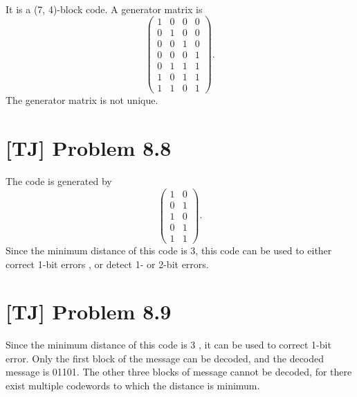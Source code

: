 \documentclass[a4paper,11pt,twocolumn]{article}
\begin{document}
\begin{enumerate}[(a)]
\begin{multline*}
    \end{multline*}
    It is a (7, 4)-block code. A generator matrix is
    $$ \begin{pmatrix}
      1 & 0 & 0 & 0 \\
      0 & 1 & 0 & 0 \\
      0 & 0 & 1 & 0 \\
      0 & 0 & 0 & 1 \\
      0 & 1 & 1 & 1 \\
      1 & 0 & 1 & 1 \\
      1 & 1 & 0 & 1
    \end{pmatrix}. $$
    The generator matrix is not unique.
  \end{enumerate}

  \section{[TJ] Problem 8.8}
  The code is generated by
  $$ \begin{pmatrix} 1 & 0 \\ 0 & 1 \\ 1 & 0 \\ 0 & 1 \\ 1 & 1 \end{pmatrix}. $$
  Since the minimum distance of this code is 3, this code can be used to either correct 1-bit errors , or detect 1- or 2-bit errors.

  \section{[TJ] Problem 8.9}
  Since the minimum distance of this code is 3 , it can be used to correct 1-bit error. Only the first block of the message can be decoded, and the decoded message is 01101. The other three blocks of message cannot be decoded, for there exist multiple codewords to which the distance is minimum.
\end{document}
